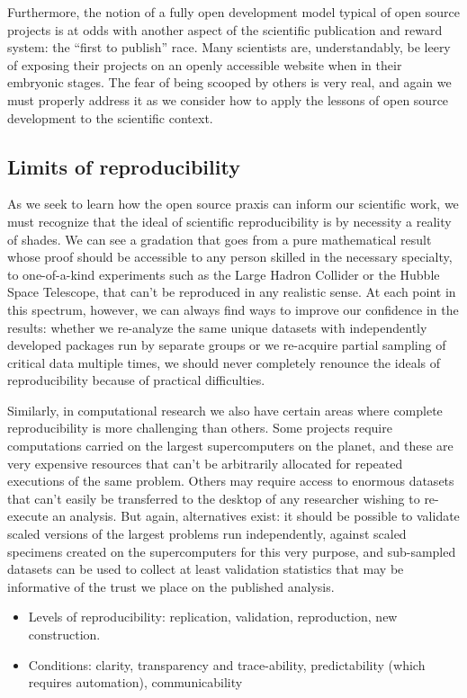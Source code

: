 \documentclass[ChapterTOCs,krantz2]{krantz} %
\begin{document}
Furthermore, the notion of a fully open development model typical
of open source projects is at odds with another aspect of the
scientific publication and reward system: the ``first
to publish'' race. Many scientists are, understandably,
be leery of exposing their projects on an openly accessible website
when in their embryonic stages. The fear of being scooped by others
is very real, and again we must properly address it as we consider
how to apply the lessons of open source development to the scientific
context.


\subsection{Limits of reproducibility}

As we seek to learn how the open source praxis can inform our scientific
work, we must recognize that the ideal of scientific reproducibility
is by necessity a reality of shades. We can see a gradation that goes
from a pure mathematical result whose proof should be accessible to
any person skilled in the necessary specialty, to one-of-a-kind experiments
such as the Large Hadron Collider or the Hubble Space Telescope, that
can't be reproduced in any realistic sense. At each point in this
spectrum, however, we can always find ways to improve our confidence
in the results: whether we re-analyze the same unique datasets with
independently developed packages run by separate groups or we re-acquire
partial sampling of critical data multiple times, we should never
completely renounce the ideals of reproducibility because of practical
difficulties.

Similarly, in computational research we also have certain areas where
complete reproducibility is more challenging than others. Some projects
require computations carried on the largest supercomputers on the
planet, and these are very expensive resources that can't be arbitrarily
allocated for repeated executions of the same problem. Others may
require access to enormous datasets that can't easily be transferred
to the desktop of any researcher wishing to re-execute an analysis.
But again, alternatives exist: it should be possible to validate scaled
versions of the largest problems run independently, against scaled
specimens created on the supercomputers for this very purpose, and
sub-sampled datasets can be used to collect at least validation statistics
that may be informative of the trust we place on the published analysis.

\begin{itemize}
\item Levels of reproducibility: replication, validation, reproduction,
new construction.
\item Conditions: clarity, transparency and trace-ability, predictability
(which requires automation), communicability
\end{itemize}
\end{document}
